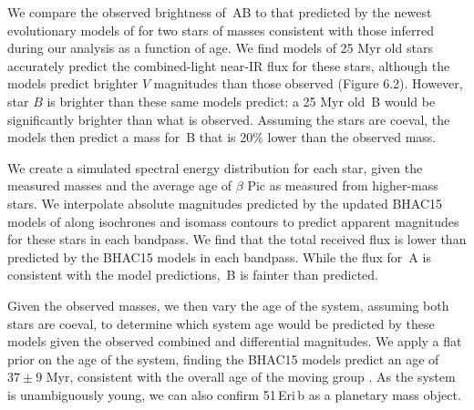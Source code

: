 We compare the observed brightness of \thisstarsix\,AB to that predicted by the newest evolutionary models
of \citet{Baraffe15} for two stars of masses consistent with those inferred during our analysis
as a function of age. 
We find models of 25 Myr old stars accurately predict the combined-light near-IR flux for these
stars, although the models predict brighter $V$ magnitudes than those observed (Figure 6.2).
However, star $B$ is brighter than these same models predict: a 25 Myr old \thisstarsix\,B would be 
significantly brighter than what is observed. 
Assuming the stars are coeval, the models then predict a mass for \thisstarsix\,B that is 20\% lower 
than the observed mass. 

We create a simulated spectral energy distribution for each star, given the measured masses and the average age of 
$\beta$ Pic as measured from higher-mass stars. 
We interpolate absolute magnitudes predicted by the updated BHAC15 models of \citet{Baraffe15} along 
isochrones and isomass contours to predict apparent 
magnitudes for these stars in each bandpass.
We find that the total received flux is lower than
predicted by the BHAC15 models in each bandpass. While the flux for \thisstarsix\,A is consistent with 
the model predictions, \thisstarsix\,B is fainter than predicted.

Given the observed masses, we then vary the age of the system, assuming both stars are coeval, 
to determine which system age would be predicted by
these models given the observed combined and differential magnitudes.
We apply a flat prior on the age of the system, finding the BHAC15 models predict an age of $37 \pm 9$ Myr, consistent with the overall
age of the moving group \citep[$24 \pm 3$ Myr,][]{Bell15}.
As the system is unambiguously young, we can also confirm 51\,Eri\,b as 
a planetary mass object.


